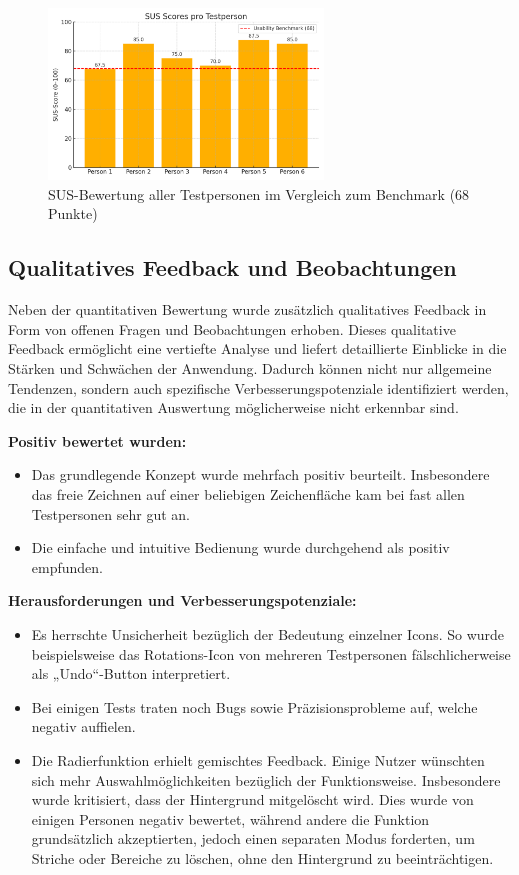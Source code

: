 \begin{figure}[H]
    \centering
    \includegraphics[width=0.65\textwidth]{graphics/sus_scores_plot.png}
    \caption{SUS-Bewertung aller Testpersonen im Vergleich zum Benchmark (68 Punkte)}
    \label{fig:sus_scores_updated_v2}
\end{figure}

\clearpage

\subsection{Qualitatives Feedback und Beobachtungen}

Neben der quantitativen Bewertung wurde zusätzlich qualitatives Feedback in Form von offenen Fragen und Beobachtungen erhoben. Dieses qualitative Feedback ermöglicht eine vertiefte Analyse und liefert detaillierte Einblicke in die Stärken und Schwächen der Anwendung. Dadurch können nicht nur allgemeine Tendenzen, sondern auch spezifische Verbesserungspotenziale identifiziert werden, die in der quantitativen Auswertung möglicherweise nicht erkennbar sind.


\textbf{Positiv bewertet wurden:}
\begin{itemize}
    \item Das grundlegende Konzept wurde mehrfach positiv beurteilt. Insbesondere das freie Zeichnen auf einer beliebigen Zeichenfläche kam bei fast allen Testpersonen sehr gut an.
    \item Die einfache und intuitive Bedienung wurde durchgehend als positiv empfunden.
\end{itemize}

\textbf{Herausforderungen und Verbesserungspotenziale:}
\begin{itemize}
    \item Es herrschte Unsicherheit bezüglich der Bedeutung einzelner Icons. So wurde beispielsweise das Rotations-Icon von mehreren Testpersonen fälschlicherweise als „Undo“-Button interpretiert.
    \item Bei einigen Tests traten noch Bugs sowie Präzisionsprobleme auf, welche negativ auffielen.
    \item Die Radierfunktion erhielt gemischtes Feedback. Einige Nutzer wünschten sich mehr Auswahlmöglichkeiten bezüglich der Funktionsweise. Insbesondere wurde kritisiert, dass der Hintergrund mitgelöscht wird. Dies wurde von einigen Personen negativ bewertet, während andere die Funktion grundsätzlich akzeptierten, jedoch einen separaten Modus forderten, um Striche oder Bereiche zu löschen, ohne den Hintergrund zu beeinträchtigen.
\end{itemize}



